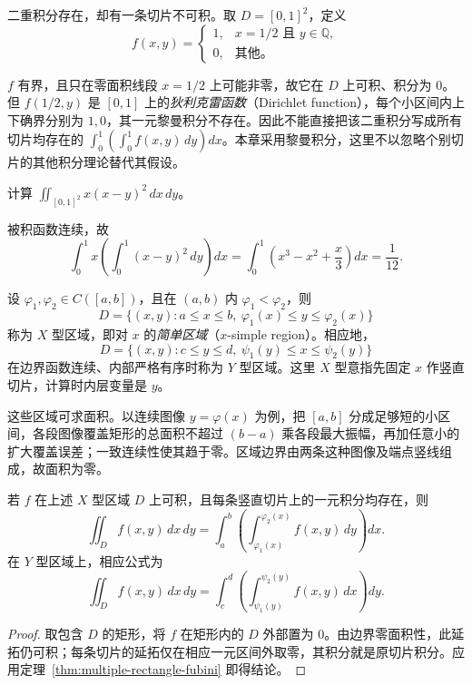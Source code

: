 \begin{example}
\label{ex:multiple-integrable-bad-slices}
二重积分存在，却有一条切片不可积。取 $D=[0,1]^2$，定义
\[
    f(x,y)=\begin{cases}1,&x=1/2\text{ 且 }y\in\mathbb Q,\\0,&\text{其他}。\end{cases}
\]
\end{example}
\begin{solve}
$f$ 有界，且只在零面积线段 $x=1/2$ 上可能非零，故它在 $D$ 上可积、积分为 $0$。但 $f(1/2,y)$ 是 $[0,1]$ 上的\emph{狄利克雷函数}（Dirichlet function），每个小区间内上下确界分别为 $1,0$，其一元黎曼积分不存在。因此不能直接把该二重积分写成所有切片均存在的 $\int_0^1(\int_0^1f(x,y)\,dy)dx$。本章采用黎曼积分，这里不以忽略个别切片的其他积分理论替代其假设。
\end{solve}

\begin{example}
\label{ex:multiple-square-polynomial}
计算 $\iint_{[0,1]^2}x(x-y)^2\,dx\,dy$。
\end{example}
\begin{solve}
被积函数连续，故
\[
    \int_0^1x\left(\int_0^1(x-y)^2\,dy\right)dx
    =\int_0^1\left(x^3-x^2+\frac{x}{3}\right)dx
    =\frac1{12}.
\]
\end{solve}

\begin{definition}
\label{def:multiple-normal-domains}
设 $\varphi_1,\varphi_2\in C([a,b])$，且在 $(a,b)$ 内 $\varphi_1<\varphi_2$，则
\[
    D=\{(x,y):a\leq x\leq b,\ \varphi_1(x)\leq y\leq\varphi_2(x)\}
\]
称为 $X$ 型区域，即对 $x$ 的\emph{简单区域}（$x$-simple region）。相应地，
\[
    D=\{(x,y):c\leq y\leq d,\ \psi_1(y)\leq x\leq\psi_2(y)\}
\]
在边界函数连续、内部严格有序时称为 $Y$ 型区域。这里 $X$ 型意指先固定 $x$ 作竖直切片，计算时内层变量是 $y$。
\end{definition}

这些区域可求面积。以连续图像 $y=\varphi(x)$ 为例，把 $[a,b]$ 分成足够短的小区间，各段图像覆盖矩形的总面积不超过 $(b-a)$ 乘各段最大振幅，再加任意小的扩大覆盖误差；一致连续性使其趋于零。区域边界由两条这种图像及端点竖线组成，故面积为零。

\begin{theorem}
\label{thm:multiple-normal-domain-fubini}
若 $f$ 在上述 $X$ 型区域 $D$ 上可积，且每条竖直切片上的一元积分均存在，则
\begin{equation}
    \iint_Df(x,y)\,dx\,dy
    =\int_a^b\left(\int_{\varphi_1(x)}^{\varphi_2(x)}f(x,y)\,dy\right)dx.
    \label{eq:multiple-x-simple-integral}
\end{equation}
在 $Y$ 型区域上，相应公式为
\begin{equation}
    \iint_Df(x,y)\,dx\,dy
    =\int_c^d\left(\int_{\psi_1(y)}^{\psi_2(y)}f(x,y)\,dx\right)dy.
    \label{eq:multiple-y-simple-integral}
\end{equation}
\end{theorem}
\begin{proof}
取包含 $D$ 的矩形，将 $f$ 在矩形内的 $D$ 外部置为 $0$。由边界零面积性，此延拓仍可积；每条切片的延拓仅在相应一元区间外取零，其积分就是原切片积分。应用定理~\ref{thm:multiple-rectangle-fubini} 即得结论。
\end{proof}

